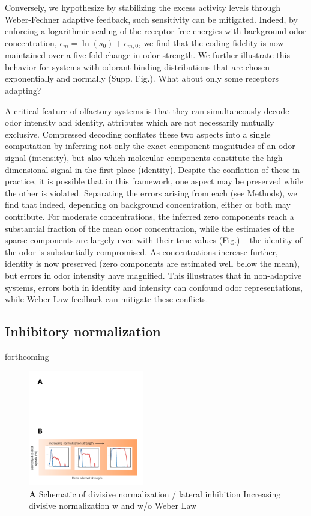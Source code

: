 Conversely, we hypothesize by stabilizing the excess activity levels through Weber-Fechner adaptive feedback, such sensitivity can be mitigated. Indeed, by enforcing a logarithmic scaling of the receptor free energies with background odor concentration, $\epsilon_m = \ln(s_0) + \epsilon_{m, 0}$, we find that the coding fidelity is now maintained over a five-fold change in odor strength. We further illustrate this behavior for systems with odorant binding distributions that are chosen exponentially and normally (Supp. Fig.). {\color{blue} What about only some receptors adapting?}



A critical feature of olfactory systems is that they can simultaneously decode odor intensity and identity, attributes which are not necessarily mutually exclusive. Compressed decoding conflates these two aspects into a single computation by inferring not only the exact component magnitudes of an odor signal (intensity), but also which molecular components constitute the high-dimensional signal in the first place (identity). Despite the conflation of these in practice, it is possible that in this framework, one aspect may be preserved while the other is violated. Separating the errors arising from each (see Methods), we find that indeed, depending on background concentration, either or both may contribute. For moderate concentrations, the inferred zero components reach a substantial fraction of the mean odor concentration, while the estimates of the sparse components are largely even with their true values (Fig.) -- the identity of the odor is substantially compromised. As concentrations increase further, identity is now preserved (zero components are estimated well below the mean), but errors in odor intensity have magnified. This illustrates that in non-adaptive systems, errors both in identity and intensity can confound odor representations, while Weber Law feedback can mitigate these conflicts. 

\subsection{Inhibitory normalization}
{\color{blue} forthcoming}

\begin{figure}
	\includegraphics[width=0.45\textwidth]{figures/Figures_signal_decoding_weber_law_2}
	\caption{\textbf{A} Schematic of divisive normalization / lateral inhibition  Increasing divisive normalization w and w/o Weber Law}
	\label{fig:divisive_normalization}
\end{figure}

